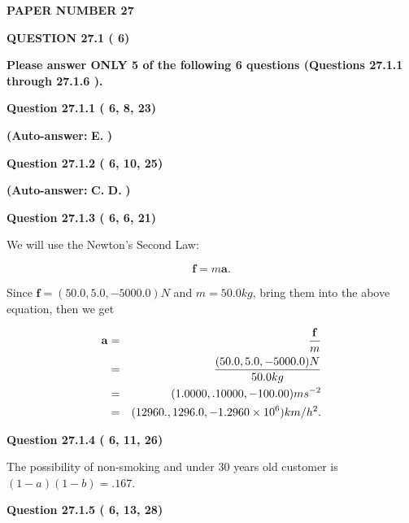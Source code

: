 \documentclass[12pt]{article}
\begin{document}
   
   
   
\newpage 
\setcounter{page}{ 
    27001 } 
   
   
 {\textbf{ \Large{ PAPER NUMBER          27 }}}
   
   
   
   
  
\vspace{0.2in}
  
{\textbf{\Large{QUESTION
27.1 
 (          6)
}}}
  
  
{\textbf{\Large{Please answer ONLY  %
           5 %
 of the following  %
           6 %
 questions (Questions  %
27.1.1 %
 through  %
27.1.6 %
 ). }}}
   
   
  
  
{\textbf{\large{Question
27.1.1 
 (          6,          8,         23)
}}}
 
 
{\textbf{(Auto-answer:}}
{\textbf{\large{
E.}}}
{\textbf{)}}
 
 
  
  
{\textbf{\large{Question
27.1.2 
 (          6,         10,         25)
}}}
 
 
{\textbf{(Auto-answer:}}
{\textbf{\large{
C.}}}
{\textbf{\large{
D.}}}
{\textbf{)}}
 
 
  
  
{\textbf{\large{Question
27.1.3 
 (          6,          6,         21)
}}}

We will use the Newton's Second Law:
 
\[
\mathbf{f}=m\mathbf{a}.
\]
 
Since $\mathbf{f}=( %
50.0,  %
5.0,  %
-5000.0 )N$
and $m= %
50.0 kg$, bring them into the above equation, then we get
 
\begin{eqnarray*}
\mathbf{a}&=&\frac{\mathbf{f}}m  \\
&=&\frac{(
50.0 ,
5.0 ,
-5000.0 )N
}{ %
50.0 kg}  \\
&=&(
1.0000 ,
.10000,
-100.00
)ms^{-2} \\
&=&(
12960. ,
1296.0 ,
-1.2960 \times 10^{6}
)km/h^2.
\end{eqnarray*}
 
  
  
{\textbf{\large{Question
27.1.4 
 (          6,         11,         26)
}}}

The possibility of  %
 non-smoking and  %
under 30 years old
customer is $ (1-a)(1-b) =  %
.167 $.
  
  
{\textbf{\large{Question
27.1.5 
 (          6,         13,         28)
}}}
\end{document}
